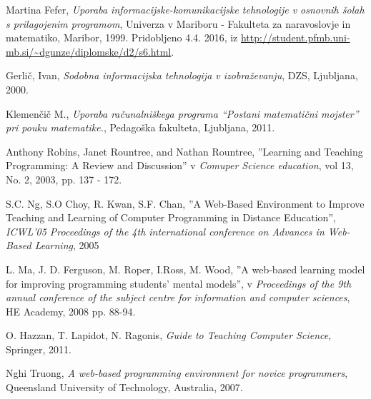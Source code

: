 \begin{thebibliography}{9}

%


  Martina Fefer,
  \emph{Uporaba informacijske-komunikacijske  tehnologije v osnovnih
    šolah s prilagojenim programom},
  Univerza v Mariboru - Fakulteta za naravoslovje in matematiko, Maribor,
  1999. Pridobljeno 4.4. 2016, iz \url{http://student.pfmb.uni-mb.si/~dgunze/diplomske/d2/s6.html}.

  Gerlič, Ivan, \emph{Sodobna informacijska tehnologija v
    izobraževanju}, DZS, Ljubljana, 2000.

  Klemenčič M., \emph{Uporaba računalniškega programa ``Postani
    matematični mojster'' pri pouku matematike.}, Pedagoška fakulteta,
  Ljubljana, 2011.

  Anthony Robins, Janet Rountree, and Nathan Rountree,
  ''Learning and Teaching Programming: A Review and
  Discussion'' v \emph{Comuper Science education}, vol 13, No. 2,
  2003, pp. 137 - 172.

  S.C. Ng, S.O Choy, R. Kwan, S.F. Chan,
  ''A Web-Based Environment to Improve Teaching and Learning of
  Computer Programming in Distance Education'', \emph{ICWL'05
    Proceedings of the 4th international conference on Advances in
    Web-Based Learning}, 2005

  L. Ma, J. D. Ferguson, M. Roper, I.Ross, M. Wood,
  ''A web-based learning model for improving programming students' mental
  models'', v \emph{Proceedings of the 9th annual conference of the subject
  centre for information and computer sciences}, HE Academy, 2008
  pp. 88-94.

  O. Hazzan, T. Lapidot, N. Ragonis,
  \emph{Guide to Teaching Computer Science}, Springer, 2011.

  Nghi Truong,
  \emph{A web-based programming environment for novice programmers},
  Queensland University of Technology, Australia, 2007.





\end{thebibliography}
